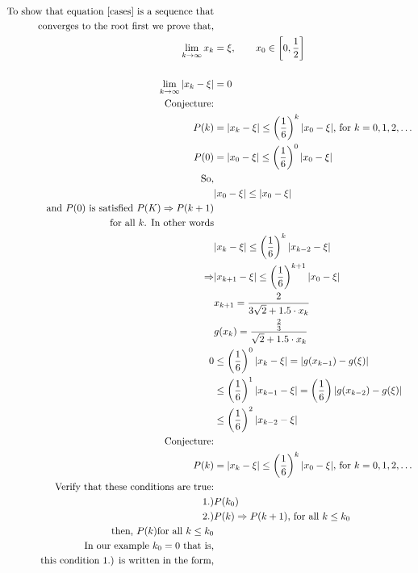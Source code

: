 \documentclass{article}
\begin{document}
\begin{align*}
    \text{To show that equation \ref{cases} is a sequence that}&\\
    \text{converges to the root first we prove that,}&\\
     \lim_{k \to \infty} x_k&= \xi, \qquad x_0 \in \left[0, \frac{1}{2} \right]\\ \\
     \lim_{k \to \infty} |x_k - \xi|&= 0\\
     \text{Conjecture:}\\
     P(k) &= |x_k-\xi| \le \left(\frac{1}{6} \right)^k|x_0-\xi| \text{, for }k=0,1,2,\dots\\
     P(0) &= |x_0-\xi| \le \left(\frac{1}{6} \right)^0|x_0-\xi| \\
     \text{So,}&\\
     &|x_0- \xi| \le |x_0 - \xi|\\
     \text{and $P(0)$ is satisfied $P(K) \Rightarrow P(k+1)$}&\\
     \text{for all $k$. In other words}&\\
     &|x_k- \xi|\le \left(\frac{1}{6} \right)^k |x_{k-2}-\xi|\\
     \Rightarrow &|x_{k+1}- \xi| \le  \left(\frac{1}{6} \right)^{k+1} |x_{0}-\xi|\\
     &x_{k+1} = \frac{2}{3\sqrt{2}+1.5\cdot x_k} \\
     &g(x_k) = \frac{\frac{2}{3}}{\sqrt{2}+1.5\cdot x_k}\\
     0 &\le \left(\frac{1}{6} \right)^0 |x_k-\xi|= |g(x_{k-1})-g(\xi)|\\
     & \le \left(\frac{1}{6} \right)^1|x_{k-1}-\xi|= \left(\frac{1}{6} \right)|g(x_{k-2})-g(\xi)| \\
     &\le \left(\frac{1}{6} \right)^2 |x_{k-2}-\xi|\\
     \text{Conjecture:}\\
     P(k) &= |x_k-\xi| \le \left(\frac{1}{6} \right)^k|x_0-\xi| \text{, for }k=0,1,2,\dots\\
     \text{Verify that these conditions are true:}&\\
     1.)&P(k_0)\\
     2.)&P(k) \Rightarrow P(k+1)\text{, for all }k \le k_0\\
     \text{then, $P(k)$for all }k \le k_0\\
     \text{In our example }k_0=0 \text{ that is,}\\
     \text{this condition 1.) is written in the form,}\\

\end{align*}
\end{document}
